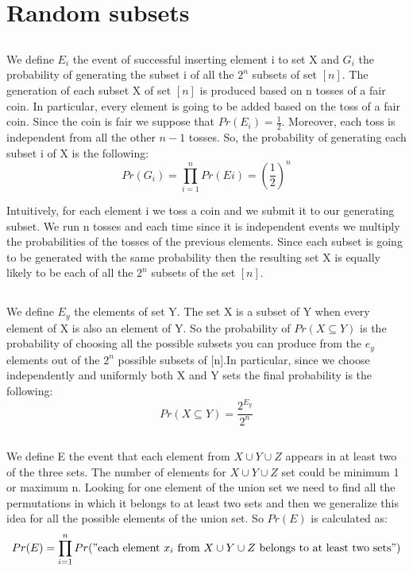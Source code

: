 \documentclass[11pt]{537homework}
\begin{document}
\section{Random subsets}

\subsection{}

We define $E_i$ the event of successful inserting element i to set X  and $G_i$ the probability of generating the subset i of all the $2^n$ subsets of set $[n]$.
The generation of each subset X of set $[n]$ is produced based on n tosses of a fair coin. In particular, every element is going to be added based on the toss of a fair coin. Since the coin is fair we suppose that $Pr(E_i) = \frac{1}{2}$. Moreover, each toss is independent from all the other $n-1$ tosses. So, the probability of generating each subset i of X is the following:
\begin{equation}
  Pr(G_i) = \prod_{i=1}^{n} Pr(Ei) = (\frac{1}{2})^{n}
\end{equation} 

Intuitively, for each element i we toss a coin and we submit it to our generating subset. We run n tosses and each time since it is independent events we multiply the probabilities of the tosses of the previous elements. Since each subset is going to be generated with the same probability then the resulting set X is equally likely to be each of all the $2^n$ subsets of the set $[n]$.
\subsection{}

We define $E_y$ the elements of set Y. The set X is a subset of Y when every element of X is also an element of Y. So the probability of $Pr(X \subseteq Y)$ is the probability of choosing all the possible subsets you can produce from  the $e_y$ elements out of the $2^n$ possible subsets of [n].In particular, since we choose independently and uniformly both X and Y sets the final probability is the following:
\begin{equation*}
  Pr(X \subseteq Y) = \frac{2^{E_y}}{2^n} 
\end{equation*} 

\subsection{}
We define E the event that each element from $X \cup Y \cup Z$ appears in at least two of the three sets. The number of elements for $X \cup Y \cup Z$ set could be minimum 1 or maximum n. Looking for one element of the union set we need to find all the permutations in which it belongs to at least two sets and then we generalize this idea for all the possible elements of the union set. So $Pr(E)$ is calculated as:\\
\begin{equation*}
  Pr(E) = \prod_{i=1}^{n} Pr("\text{each element $x_i$ from $X \cup Y \cup Z$ belongs to at least two sets}") \\
\end{equation*} 
\end{document}

